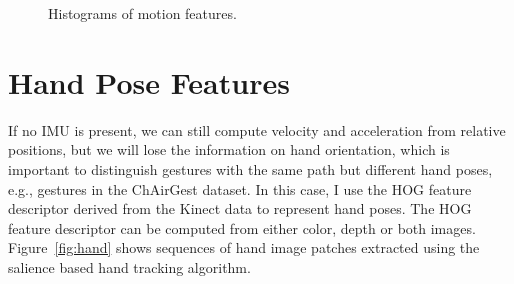 \begin{figure}[!tbh]
\centering
{}
\caption{Histograms of motion features.}
\end{figure}


\section{Hand Pose Features}
If no IMU is present, we can still compute velocity and acceleration from
relative positions, but we will lose the information on hand orientation, which
is important to distinguish gestures with the same path but different hand
poses, e.g., gestures in the ChAirGest dataset. In this case, 
I use the HOG feature descriptor derived from the Kinect data to represent hand
poses.
The HOG feature descriptor can be computed from either color, depth or both images. Figure~\ref{fig:hand}
shows sequences of hand image patches extracted using the salience based hand
tracking algorithm.

